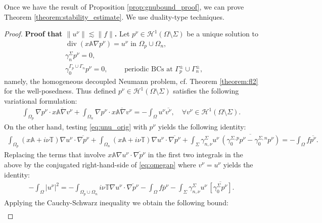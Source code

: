\documentclass[report]{elsarticle}
\numberwithin{theorem}{section}
\begin{document}
Once we have the result of Proposition \ref{prop:gnubound_proof}, we can prove Theorem \ref{theorem:stability_estimate}. 
We use  duality-type techniques. 
\begin{proof}
	\textbf{Proof that $\|u^{\nu}\|\lesssim \|f\|$. }
	Let $p^{\nu}\in \mathcal{H}^1(\Omega\setminus\Sigma)$ be a unique solution to 
	\begin{align*}
		&\operatorname{div}\left(x \mathbb{A}\nabla p^{\nu}\right)=u^{\nu} \text{  in }\Omega_p\cup\Omega_n,\\
		&\gamma_{n}^{\Sigma}p^{\nu}=0,\\ &\gamma_0^{\Gamma_p\cup\Gamma_n}p^{\nu}=0,\qquad \text{ periodic BCs at }\Gamma_p^{\pm}\cup\Gamma_n^{\pm},
	\end{align*}
	namely, the homogeneous decoupled Neumann problem, 
	cf. Theorem \ref{theorem:fl2} for the well-posedness. Thus defined $p^{\nu}\in \mathcal{H}^1(\Omega\setminus\Sigma)$ satisfies the following variational formulation: 
	\begin{align}
		\label{eq:omegap}
		\int_{\Omega_p}\nabla p^{\nu}\cdot\overline{x \mathbb{A}\nabla v^{\nu}}+\int_{\Omega_n}\nabla p^{\nu}\cdot\overline{ x \mathbb{A}\nabla v^{\nu}}=-\int_{\Omega}u^{\nu}\overline{v^{\nu}},\quad \forall v^{\nu}\in \mathcal{H}^1(\Omega\setminus \Sigma).
	\end{align}
	On the other hand, testing \eqref{eq:unu_orig} with $p^{\nu}$ yields the following identity:
	\begin{align*}
		\int_{\Omega_p}( x \mathbb{A}+i\nu\mathbb{T})\nabla u^{\nu}\cdot\overline{\nabla p^{\nu}}+	\int_{\Omega_n}( x \mathbb{A}+i\nu\mathbb{T})\nabla u^{\nu}\cdot\overline{\nabla p^{\nu}}+\int_{\Sigma} \gamma_{n, \nu}^{\Sigma}u^{\nu}\, \overline{\left(\gamma_{0}^{\Sigma,p}p^{\nu}-\gamma_{0}^{\Sigma,n}p^{\nu}\right)}=-\int_{\Omega}f\overline{p^{\nu}}.
	\end{align*}
	Replacing the terms that involve $x\mathbb{A}\nabla u^{\nu}\cdot\overline{\nabla p^{\nu}}$ in the first two integrals in the above by the conjugated right-hand-side of \eqref{eq:omegap} where $v^{\nu}=u^{\nu}$ yields the identity:
	\begin{align*}
		-\int_{\Omega}|u^{\nu}|^2=-\int_{\Omega_p\cup\Omega_n}i\nu\mathbb{T}\nabla u^{\nu}\cdot\overline{\nabla p^{\nu}}-\int_{\Omega}f\overline{p}^{\nu}-\int_{\Sigma} \gamma_{n, \nu}^{\Sigma}u^{\nu}\, \overline{[\gamma_0^{\Sigma}p^{\nu}]}.
	\end{align*}
	Applying the Cauchy-Schwarz inequality we obtain the following bound:
	\begin{align*}

\end{align*}
\end{proof}
\end{document}

